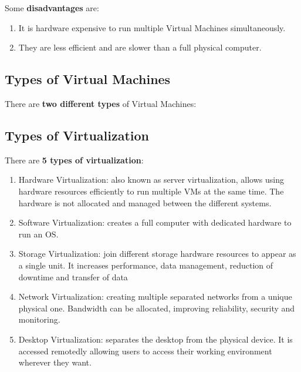 \documentclass[a4paper]{article}
\newcommand\tab[1][1cm]{\hspace*{#1}}
\begin{document}
    \vspace{0.5cm}

    \tab Some \textbf{disadvantages} are:
    \begin{enumerate}
        \item It is hardware expensive to run multiple Virtual Machines simultaneously.
        \item They are less efficient and are slower than a full physical computer.
    \end{enumerate}

    \vspace{0.5cm}

    \subsection{Types of Virtual Machines}
    \tab There are \textbf{two different types} of Virtual Machines:
    \vspace{0.35cm}

    \begin{center}
    \end{center}

    \vspace{0.5cm}
    \subsection{Types of Virtualization}
    \tab There are \textbf{5 types of virtualization}:

    \vspace{0.15cm}

    \begin{enumerate}
        \item Hardware Virtualization: also known as server virtualization, allows using hardware resources
            efficiently to run multiple VMs at the same time. The hardware is not allocated and
            managed between the different systems.
        \item Software Virtualization: creates a full computer with dedicated hardware to run an OS.
        \item Storage Virtualization: join different storage hardware resources to appear as a single unit.
            It increases performance, data management, reduction of downtime and transfer of data
        \item Network Virtualization: creating multiple separated networks from a unique physical one.
           Bandwidth can be allocated, improving reliability, security and monitoring.
        \item Desktop Virtualization: separates the desktop from the physical device. It is accessed remotedly
            allowing users to access their working environment wherever they want.
    \end{enumerate}
\end{document}
